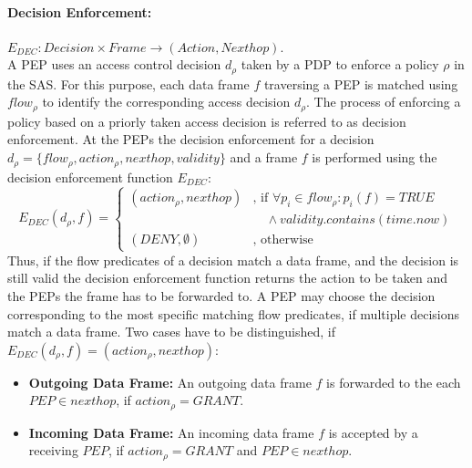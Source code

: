\paragraph{Decision Enforcement:} $E_{DEC}: Decision \times Frame \rightarrow (Action, Nexthop)$.\\
A PEP uses an access control decision $d_{\rho}$ taken by a PDP to enforce a policy $\rho$ in the SAS.
For this purpose, each data frame $f$ traversing a PEP is matched using $flow_\rho$ to identify the corresponding access decision $d_{\rho}$.
The process of enforcing a policy based on a priorly taken access decision is referred to as decision enforcement.
At the PEPs the decision enforcement for a decision $d_{\rho} = \{flow_\rho, action_\rho, nexthop, validity\}$ and a frame $f$ is performed using the decision enforcement function $E_{DEC}$:
\[
    E_{DEC}(d_{\rho}, f) =
    \begin{cases}
        (action_\rho, nexthop) & \text{, if } \forall p_i \in flow_{\rho}: p_i(f) = TRUE\\
        & \quad \land validity.contains(time.now)\\
        (DENY, \emptyset) & \text{, otherwise}
    \end{cases}
\]
Thus, if the flow predicates of a decision match a data frame, and the decision is still valid the decision enforcement function returns the action to be taken and the PEPs the frame has to be forwarded to.
A PEP may choose the decision corresponding to the most specific matching flow predicates, if multiple decisions match a data frame.
Two cases have to be distinguished, if $E_{DEC}(d_{\rho}, f) = (action_\rho, nexthop)$:
\begin{itemize}
    \item \textbf{Outgoing Data Frame:} An outgoing data frame $f$ is forwarded to the each $PEP \in nexthop$, if $action_\rho = GRANT$.
    \item \textbf{Incoming Data Frame:} An incoming data frame $f$ is accepted by a receiving $PEP$, if $action_\rho = GRANT$ and $PEP \in nexthop$.
\end{itemize}

